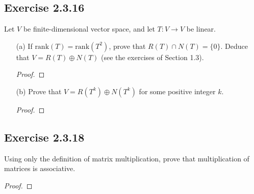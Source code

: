 \subsection*{Exercise 2.3.16} Let \( V  \) be finite-dimensional vector space, and let \( T: V \to V  \) be linear.
\begin{enumerate}
    \item[(a)] If \( \text{rank}(T) = \text{rank}(T^{2}) \), prove that \( R(T) \cap N(T) = \{ 0  \}   \). Deduce that \( V = R(T) \oplus N(T)  \) (see the exercises of Section 1.3).
        \begin{proof}
        
        \end{proof}
    \item[(b)] Prove that \( V = R(T^{k }) \oplus N(T^{k }) \) for some positive integer \( k  \).
        \begin{proof}
        
        \end{proof}
\end{enumerate}

\subsection*{Exercise 2.3.18} Using only the definition of matrix multiplication, prove that multiplication of matrices is associative. 
\begin{proof}

\end{proof}
